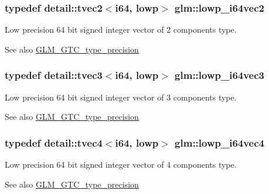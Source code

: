 \subsubsection[{\texorpdfstring{lowp\+\_\+i64vec2}{lowp_i64vec2}}]{\setlength{\rightskip}{0pt plus 5cm}typedef detail\+::tvec2$<$i64, lowp$>$ {\bf glm\+::lowp\+\_\+i64vec2}}\hypertarget{group__gtc__type__precision_gad88a04aaa07fabf57fdbad8e6b7bcc9c}{}\label{group__gtc__type__precision_gad88a04aaa07fabf57fdbad8e6b7bcc9c}
Low precision 64 bit signed integer vector of 2 components type. \begin{DoxySeeAlso}{See also}
\hyperlink{group__gtc__type__precision}{G\+L\+M\+\_\+\+G\+T\+C\+\_\+type\+\_\+precision} 
\end{DoxySeeAlso}
\subsubsection[{\texorpdfstring{lowp\+\_\+i64vec3}{lowp_i64vec3}}]{\setlength{\rightskip}{0pt plus 5cm}typedef detail\+::tvec3$<$i64, lowp$>$ {\bf glm\+::lowp\+\_\+i64vec3}}\hypertarget{group__gtc__type__precision_gaa42f666ccdb6d1ef6326882b4f377678}{}\label{group__gtc__type__precision_gaa42f666ccdb6d1ef6326882b4f377678}
Low precision 64 bit signed integer vector of 3 components type. \begin{DoxySeeAlso}{See also}
\hyperlink{group__gtc__type__precision}{G\+L\+M\+\_\+\+G\+T\+C\+\_\+type\+\_\+precision} 
\end{DoxySeeAlso}
\subsubsection[{\texorpdfstring{lowp\+\_\+i64vec4}{lowp_i64vec4}}]{\setlength{\rightskip}{0pt plus 5cm}typedef detail\+::tvec4$<$i64, lowp$>$ {\bf glm\+::lowp\+\_\+i64vec4}}\hypertarget{group__gtc__type__precision_ga95c13b9d4f94d1783e7d96534d1651d8}{}\label{group__gtc__type__precision_ga95c13b9d4f94d1783e7d96534d1651d8}
Low precision 64 bit signed integer vector of 4 components type. \begin{DoxySeeAlso}{See also}
\hyperlink{group__gtc__type__precision}{G\+L\+M\+\_\+\+G\+T\+C\+\_\+type\+\_\+precision} 
\end{DoxySeeAlso}
